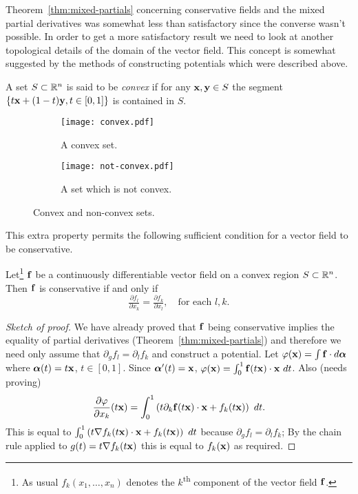 Theorem~\ref{thm:mixed-partials} concerning conservative fields and the mixed partial derivatives was somewhat less than satisfactory since the converse wasn't possible.
In order to get a more satisfactory result we need to look at another topological details of the domain of the vector field.
This concept is somewhat suggested by the methods of constructing potentials which were described above.

\begin{definition}%
    \label{def:convex}
    A set \(S\subset \mathbb{R}^n\) is said to be \emph{convex} if for any \(\mathbf{x},\mathbf{y}\in S\) the segment \(\{t\mathbf{x} + (1-t)\mathbf{y}, t\in[0,1]\}\) is contained in \(S\).
\end{definition}

\begin{figure}
    \centering
    \begin{subfigure}[b]{0.5\textwidth}
        \texttt{[image: convex.pdf]}
        \caption{A convex set.}
    \end{subfigure}%
    \begin{subfigure}[b]{0.5\textwidth}
        \texttt{[image: not-convex.pdf]}
        \caption{A set which is not convex.}
    \end{subfigure}
    \caption{Convex and non-convex sets.}
\end{figure}

This extra property permits the following sufficient condition for a vector field to be conservative.

\begin{theorem}
    Let\footnote{As usual  \(  f_k(x_1,\ldots,x_n)\) denotes the \(k\)\textsuperscript{th} component of the vector field \(\mathbf{f}\).} \(\mathbf{f}\) be a continuously differentiable vector field on a convex region \(S\subset \mathbb{R}^n\).
    Then \(\mathbf{f}\) is conservative if and only if
    \[
        \tfrac{\partial f_l}{\partial x_k} = \tfrac{\partial f_k}{\partial x_l},
        \quad \text{for each \(l,k\)}.
    \]
\end{theorem}

\begin{proof}[Sketch of proof]
    We have already proved that \(\mathbf{f}\) being conservative implies the equality of partial derivatives (Theorem~\ref{thm:mixed-partials}) and therefore we need only assume that \(\partial_g f_l = \partial_l f_k\) and construct a potential.
    Let \(\varphi(\mathbf{x}) = \int \mathbf{f} \cdot d\boldsymbol{\alpha}\) where \(\boldsymbol{\alpha}(t) = t\mathbf{x}\), \(t\in[0,1]\).
    Since \(\boldsymbol{\alpha}'(t) = \mathbf{x}\), \(\varphi(\xx) = \int_0^1 \ff(t\xx)\cdot \xx \ dt\).
    Also (needs proving)
    \[
        \frac{\partial \varphi}{\partial x_k}(t\mathbf{x}) = \int_{0}^{1} \left( t \partial_k \mathbf{f}(t\mathbf{x}) \cdot \mathbf{x} + f_k(t\mathbf{x}) \right) \ dt.
    \]
    This is equal to \(\int_{0}^{1} \left( t \nabla f_k(t\mathbf{x}) \cdot \mathbf{x} + f_k(t\mathbf{x}) \right) \ dt\) because  \(\partial_g f_l = \partial_l f_k\);
    By the chain rule applied to \(g(t) = t \nabla f_k(t\mathbf{x}) \) this is equal to \(f_k(\mathbf{x})\) as required.
\end{proof}


